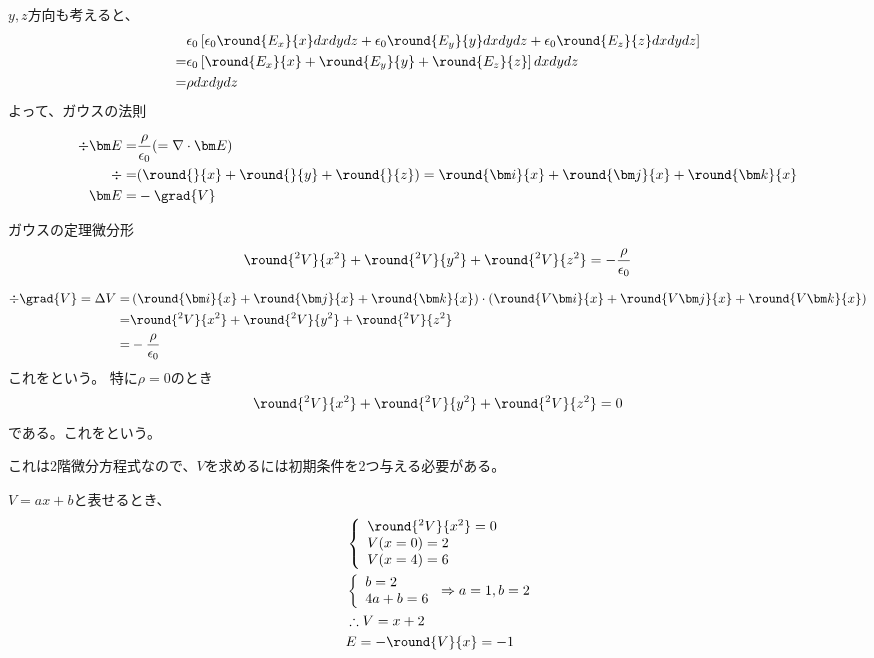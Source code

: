 \documentclass[12pt]{ltjsarticle}
\begin{document}
$y,z$方向も考えると、
\begin{align*}
&\epsilon_0\left[
\epsilon_0\round{E_x}{x}dxdydz+
\epsilon_0\round{E_y}{y}dxdydz+
\epsilon_0\round{E_z}{z}dxdydz
\right]\\
=&\epsilon_0\left[\round{E_x}{x}+\round{E_y}{y}+\round{E_z}{z}\right]dxdydz\\
=&\rho dxdydz
\end{align*}
よって、ガウスの法則

\begin{align*}
\div{\vE}=&\frac{\rho}{\epsilon_0}(=\nabla\cdot\vE)\\
\div=&(\round{}{x}+\round{}{y}+\round{}{z})
=\round{\vi}{x}+\round{\vj}{x}+\round{\vk}{x}\\
\vE=&-\grad{V}
\end{align*}

\begin{itembox}[htbp]{ガウスの定理微分形}
\begin{align*}
\round{^2V}{x^2}+
\round{^2V}{y^2}+
\round{^2V}{z^2}=
-\frac{\rho}{\epsilon_0}
\end{align*}
\end{itembox}

\begin{align*}
\div\grad{V}=\Delta V=&
\left(\round{\vi}{x}+\round{\vj}{x}+\round{\vk}{x}\right)\cdot
\left(\round{V\vi}{x}+\round{V\vj}{x}+\round{V\vk}{x}\right)\\
=&\round{^2V}{x^2}+\round{^2V}{y^2}+\round{^2V}{z^2}\\
=&-\frac{\rho}{\epsilon_0} 
\end{align*}
これをという。
特に$\rho=0$のとき
\begin{align*}
\round{^2V}{x^2}+\round{^2V}{y^2}+\round{^2V}{z^2}=0
\end{align*}
である。これをという。

これは2階微分方程式なので、$V$を求めるには初期条件を2つ与える必要がある。

$V=ax+b$と表せるとき、
\begin{align*}
&\left\{
\begin{array}{l}
\round{^2V}{x^2}=0\\
V(x=0)=2\\
V(x=4)=6
\end{array}
\right.\\
&\left\{
\begin{array}{l}
b=2\\
4a+b=6\\
\end{array}
\right.
\Rightarrow a=1,b=2\\
&\therefore V=x+2\\
&E=-\round{V}{x}=-1
\end{align*}
\end{document}
